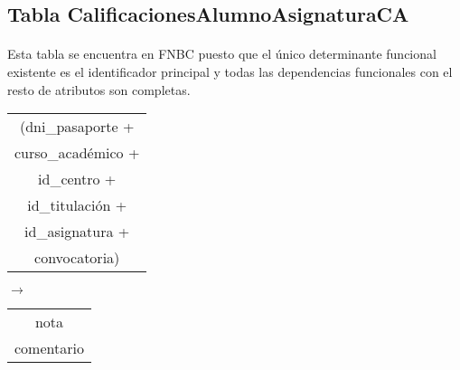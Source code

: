 \subsection{Tabla CalificacionesAlumnoAsignaturaCA}

  \paragraph{}Esta tabla se encuentra en FNBC puesto que el único determinante
  funcional existente es el identificador principal y todas las dependencias
  funcionales con el resto de atributos son completas.

 \begin{center}
    \begin{minipage}{4.2cm}{\begin{flushright}\begin{tabular}{ | c | }
                  \hline
                  (dni\_pasaporte + \\
                  curso\_académico + \\
                  id\_centro + \\
                  id\_titulación + \\
                  id\_asignatura + \\
                  convocatoria) \\
                  \hline
                 \end{tabular}\end{flushright} }
    \end{minipage}
    \begin{minipage}{0.7cm}{$\longrightarrow$}
    \end{minipage}
    \begin{minipage}{5.9cm}{\begin{tabular}{ | c | }
                  \hline
                  nota \\
                  comentario \\
                  \hline
                 \end{tabular} }
    \end{minipage}
  \end{center}
